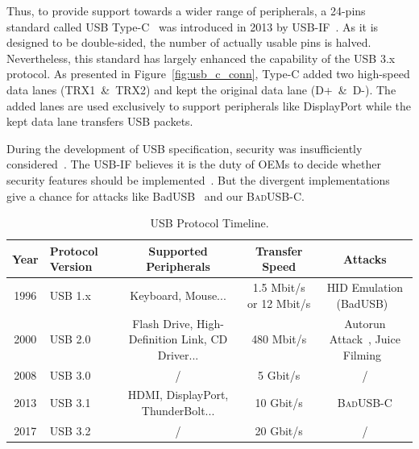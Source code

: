 \documentclass[conference]{IEEEtran}
\newcommand{\tool}{\mbox{\textsc{BadUSB-C}}\xspace}
\newcommand{\outline}[1]{}
\newcommand{\fengwei}[1]{}
\providecommand{\DIFaddtex}[1]{{\protect\color{blue}\uwave{#1}}} %
\providecommand{\DIFaddbegin}{} %
\providecommand{\DIFaddend}{} %
\providecommand{\DIFadd}[1]{\texorpdfstring{\DIFaddtex{#1}}{#1}} %
\newcommand{\DIFaddincludegraphics}[2][]{{\color{blue}\fbox{\DIFOincludegraphics[#1]{#2}}}} %
\DeclareRobustCommand{\DIFaddbegin}{\DIFOaddbegin \let\includegraphics\DIFaddincludegraphics} %
\DeclareRobustCommand{\DIFaddend}{\DIFOaddend \let\includegraphics\DIFOincludegraphics} %
\begin{document}
Thus, to provide support towards a wider range of peripherals, a 24-pins
standard called \ac{USB} Type-C~\cite{typec} was introduced in 2013 by \ac{USB}-IF~\cite{usbif}. As it is designed to be double-sided, the number of actually usable
pins is halved. Nevertheless, this standard has largely enhanced the capability
of the \ac{USB} 3.x protocol. As presented in Figure~\ref{fig:usb_c_conn}, Type-C added
two high-speed data lanes \mbox{(TRX1 \& TRX2)} and kept the original data lane \mbox{(D+ \&
D-)}. The added lanes are used exclusively to support peripherals like
DisplayPort while the kept data lane transfers \ac{USB} packets.

During the development of \DIFaddbegin \DIFadd{the }\DIFaddend \ac{USB} specification, security was insufficiently considered~\cite{sok}. 
The \ac{USB}-IF believes it is the duty of \acp{OEM}
to decide whether security features should be implemented~\cite{usbsec}. But the divergent implementations give a chance for attacks like
BadUSB~\cite{rubber} and our \tool.

\begin{table}
\begin{tabular}{|c|l|c|c|c|}
	\hline
	\textbf{Year} & \textbf{Protocol Version} & \textbf{Supported Peripherals} & \textbf{Transfer Speed} & \textbf{Attacks} \\
	\hline
	1996 & \ac{USB} 1.x~\cite{usb10,usb11} & Keyboard, Mouse... & 1.5 Mbit/s or 12 Mbit/s & \ac{HID} Emulation (BadUSB)~\cite{badusb} \\
	\hline
	2000 & \ac{USB} 2.0~\cite{usb20} & Flash Drive, High-Definition Link, CD Driver... & 480 Mbit/s & Autorun Attack~\cite{duqu}, Juice Filming~\cite{JFC,JFCImpact} \\
	\hline
	2008 & \ac{USB} 3.0~\cite{usb30} & / & 5 Gbit/s & / \\
	\hline
	2013 & \ac{USB} 3.1~\cite{usb31} & HDMI, DisplayPort, ThunderBolt... & 10 Gbit/s & \tool \\
	\hline
	2017 & \ac{USB} 3.2~\cite{usb32} & / & 20 Gbit/s & / \\
	\hline
\end{tabular}
	\linebreak
\caption{\ac{USB} Protocol Timeline.}
\label{table:usb_timeline}
\end{table}
\end{document}

